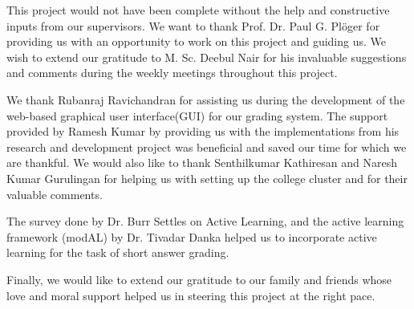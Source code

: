 

    \begin{acknowledgements}
        This project would not have been complete without the help and constructive inputs from our supervisors. We want to thank Prof. Dr. Paul G. Pl{\"o}ger for providing us with an opportunity to work on this project and guiding us. We wish to extend our gratitude to M. Sc. Deebul Nair for his invaluable suggestions and comments during the weekly meetings throughout this project. 
        
        We thank Rubanraj Ravichandran for assisting us during the development of the web-based graphical user interface(GUI) for our grading system. The support provided by Ramesh Kumar by providing us with the implementations from his research and development project was beneficial and saved our time for which we are thankful. We would also like to thank Senthilkumar Kathiresan and Naresh Kumar Gurulingan for helping us with setting up the college cluster and for their valuable comments.
        
        The survey done by Dr. Burr Settles on Active Learning, and the active learning framework (modAL) by Dr. Tivadar Danka helped us to incorporate active learning for the task of short answer grading.
        
        Finally, we would like to extend our gratitude to our family and friends whose love and moral support helped us in steering this project at the right pace.       
    \end{acknowledgements}

